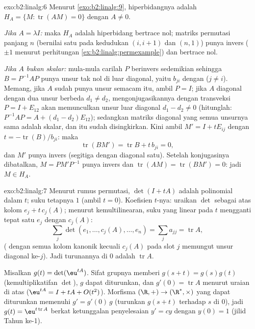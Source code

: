 \begin{solution}{exo:b2:linalg:6}
Menurut \cref{exo:b2:linalg:9}, hiperbidangnya adalah $H_A = \{M :
\operatorname{tr}(AM) = 0\}$ dengan $A \neq 0$.

\emph{Jika $A = \lambda I$:} maka $H_A$ adalah hiperbidang bertrace nol;
matriks permutasi  panjang $n$ (bernilai satu pada kedudukan $(i,
i+1)$ dan $(n, 1)$) punya invers ( $\pm 1$ menurut
perhitungan \cref{ex:b2:linalg:permexample}) dan bertrace nol.

\emph{Jika $A$ bukan skalar:} mula-mula carilah $P$ berinvers sedemikian
sehingga $B = P^{-1}AP$ punya unsur tak nol di luar diagonal, yaitu $b_{ji}$
dengan ($j \neq i$). Memang, jika $A$ sudah punya unsur semacam itu, ambil $P = I$;
jika $A$ diagonal dengan dua unsur berbeda $d_1 \neq d_2$, mengonjugasikannya
dengan transveksi $P = I + E_{12}$ akan memunculkan unsur luar diagonal
$d_1 - d_2 \neq 0$ (hitunglah: $P^{-1}AP = A + (d_1 - d_2)E_{12}$);
sedangkan matriks diagonal yang semua unsurnya sama adalah
skalar, dan itu sudah disingkirkan. Kini ambil $M' = I + tE_{ij}$ dengan
$t = -\operatorname{tr}(B)/b_{ji}$: maka
\[
\operatorname{tr}(BM') = \operatorname{tr} B + t\,b_{ji} = 0,
\]
dan $M'$ punya invers (segitiga dengan diagonal satu). Setelah
konjugasinya dibatalkan, $M = PM'P^{-1}$ punya invers dan
$\operatorname{tr}(AM) = \operatorname{tr}(BM') = 0$: jadi $M \in H_A$.
\end{solution}

\begin{solution}{exo:b2:linalg:7}
Menurut rumus permutasi, $\det(I + tA)$ adalah polinomial dalam $t$;
suku tetapnya $1$ (ambil $t = 0$). Koefisien $t$-nya: uraikan
$\det$ sebagai  atas kolom $e_j + t\,c_j(A)$; menurut
kemultilinearan, suku yang linear pada $t$ mengganti tepat satu $e_j$
dengan $c_j(A)$:
\[
\sum_{j} \det(e_1, \dots, c_j(A), \dots, e_n)
= \sum_j a_{jj} = \operatorname{tr} A ,
\]
( dengan semua kolom kanonik kecuali $c_j(A)$ pada slot
$j$ memungut unsur diagonal ke-$j$). Jadi turunannya di $0$ adalah
$\operatorname{tr} A$.

Misalkan $g(t) = \det(\eu^{tA})$. Sifat grupnya memberi $g(s + t) =
g(s)g(t)$ (kemultiplikatifan $\det$), $g$ dapat diturunkan, dan
$g'(0) = \operatorname{tr} A$ menurut uraian di atas ($\eu^{tA} = I + tA +
O(t^2)$). Morfisma $(\R, +) \to (\R^*, \times)$ yang dapat diturunkan
memenuhi $g' = g'(0)\,g$ (turunkan $g(s+t)$ terhadap $s$ di $0$), jadi
$g(t) = \eu^{t\operatorname{tr} A}$ berkat ketunggalan penyelesaian
$y' = cy$ dengan $y(0) = 1$ (jilid Tahun ke-1).
\end{solution}


